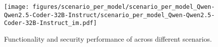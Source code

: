 
\begin{figure}[h]
    \centering
    \texttt{[image: figures/scenario\_per\_model/scenario\_per\_model\_Qwen-Qwen2.5-Coder-32B-Instruct/scenario\_per\_model\_Qwen-Qwen2.5-Coder-32B-Instruct\_im.pdf]}
    \caption{Functionality and security performance of \qwencoder{} across different scenarios.}
    \label{fig:scenario_per_model_Qwen-Qwen2.5-Coder-32B-Instruct}
\end{figure}
